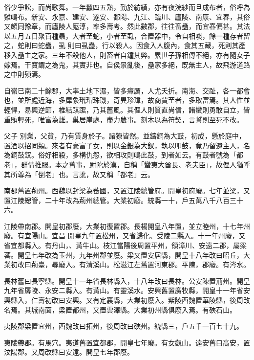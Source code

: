 \begin{pinyinscope}
 俗少爭訟，而尚歌舞。一年蠶四五熟，勤於紡績，亦有夜浣紗而旦成布者，俗呼為雞鳴布。新安、永嘉、建安、遂安、鄱陽、九江、臨川、廬陵、南康、宜春，其俗又頗同豫章，而廬陵人厖淳，率多壽考。然此數郡，往往畜蠱，而宜春偏甚。其法以五月五日聚百種蟲，大者至蛇，小者至虱，合置器中，令自相啖，餘一種存者留之，蛇則曰蛇蠱，虱
 則曰虱蠱，行以殺人。因食入人腹內，食其五藏，死則其產移入蠱主之家。三年不殺他人，則畜者自鐘其弊。累世子孫相傳不絕，亦有隨女子嫁焉。干寶謂之為鬼，其實非也。自侯景亂後，蠱家多絕，既無主人，故飛游道路之中則殞焉。



 自嶺已南二十餘郡，大率土地下濕，皆多瘴厲，人尤夭折。南海、交趾，各一都會也，並所處近海，多犀象玳瑁珠璣，奇異珍瑋，故商賈至者，多取富焉。其人性並輕悍，易興逆節，椎結踑踞，乃其舊風。其俚人則質直尚信，諸蠻則勇敢自立，皆重賄輕死，唯富為雄。巢居崖處，盡力農事。刻木以為符契，言誓則至死不改。



 父子
 別業，父貧，乃有質身於子。諸獠皆然。並鑄銅為大鼓，初成，懸於庭中，置酒以招同類。來者有豪富子女，則以金銀為大釵，執以叩鼓，竟乃留遺主人，名為銅鼓釵。俗好相殺，多構仇怨，欲相攻則鳴此鼓，到者如云。有鼓者號為「都老」，群情推服。本之舊事，尉陀於漢，自稱「蠻夷大酋長、老夫臣」，故俚人猶呼其所尊為「倒老」也。言訛，故又稱「都老」云。



 南郡舊置荊州。西魏以封梁為蕃國，又置江陵總管府。開皇初府廢。七年並梁，又置江陵總管，二十年改為荊州總管。大業初廢。統縣一十，戶五萬八千八百三十六。



 江陵帶南郡。開皇初郡廢，大業初復置郡。長楊開皇八年置，並立睦州，十七年州廢。有宜陽山。宜昌
 開皇九年置松州，又省歸化、受陵二縣入。十一年州廢，又省宜都縣入。有丹山，、黃牛山。枝江當陽後周置平州，領漳川、安遠二郡，屬梁蕃。開皇七年改為玉州，九年州郡並廢。梁又置安居縣，開皇十八年改曰昭丘，大業初改曰荊臺，尋廢入。有清溪山。松滋江左舊置河東郡。平陳，郡廢。有涔水。



 長林舊曰長寧縣。開皇十一年省長林縣入，十八年改曰長林。公安陳置荊州。開皇九年省孱陵、永安二縣入。有黃山。有靈溪水。安興舊置廣牧縣，開皇十一年省安興縣入，仁壽初改曰安興。又有定襄縣，大業初廢入。紫陵西魏置華陵縣，後周改名焉。其城南面，梁置都州，又置雲澤縣。大業初州縣俱廢入焉。有硤石山。



 夷陵郡梁置宜州，西魏改曰拓州，後周改曰硤州。統縣三，戶五千一百七十九。



 夷陵帶郡。有馬穴。夷道舊置宜都郡，開皇七年廢。有女觀山。遠安舊曰高安，置汶陽郡。又周改縣曰安遠。開皇七年郡廢。




\end{pinyinscope}
